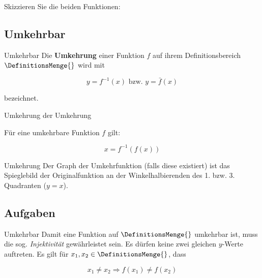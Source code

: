 Skizzieren Sie die beiden Funktionen:

\newpage


\subsection{Umkehrbar}
\begin{definition}{Umkehrbar}{}
Die \textbf{Umkehrung} einer Funktion $f$ auf ihrem Definitionsbereich
$\DefinitionsMenge{}$ wird mit

  $$y= f^{-1}(x) \text{ bzw. } y=\bar{f}(x)$$

bezeichnet.
\end{definition}

\begin{gesetz}{Umkehrung der Umkehrung}{}

  Für eine umkehrbare Funktion $f$ gilt:
  
  $$x= f^{-1}(f(x))$$
\end{gesetz}

\begin{bemerkung}{Umkehrung}{}
 Der Graph der Umkehrfunktion (falls diese existiert) ist das
 Spieglebild der Originalfunktion 
 an der Winkelhalbierenden des 1. bzw. 3. Quadranten ($y=x$).
\end{bemerkung}
\newpage


\subsection{Aufgaben}



\newpage


\begin{gesetz}{Umkehrbar}{}
  Damit eine Funktion auf $\DefinitionsMenge{}$ umkehrbar ist, muss die sog. \textit{Injektivität} gewährleistet sein. Es dürfen keine zwei
  gleichen $y$-Werte auftreten. Es gilt für $x_1,x_2\in\DefinitionsMenge{}$,
  dass
  
  $$x_1\ne x_2 \Longrightarrow f(x_1) \ne f(x_2)$$
\end{gesetz}


